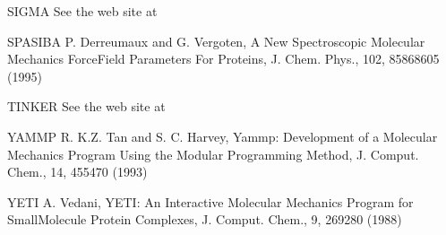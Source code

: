 \documentclass[letterpaper,11pt,english]{sphinxmanual}
\begin{document}
SIGMA     See the web site at 

SPASIBA     P. Derreumaux and G. Vergoten, A New Spectroscopic Molecular Mechanics Force\sphinxhyphen{}Field \sphinxhyphen{} Parameters For Proteins, J. Chem. Phys., 102, 8586\sphinxhyphen{}8605 (1995)

TINKER     See the web site at 

YAMMP     R. K.\sphinxhyphen{}Z. Tan and S. C. Harvey, Yammp: Development of a Molecular Mechanics Program Using the Modular Programming Method, J. Comput. Chem., 14, 455\sphinxhyphen{}470 (1993)

YETI     A. Vedani, YETI: An Interactive Molecular Mechanics Program for Small\sphinxhyphen{}Molecule Protein Complexes, J. Comput. Chem., 9, 269\sphinxhyphen{}280 (1988)
\end{document}
